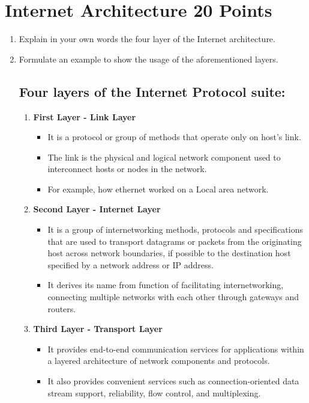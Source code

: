 \documentclass{resources/WeSTassignment}
\begin{document}
\begin{enumerate}
\end{enumerate}

	
\section{Internet Architecture \hfill{20 Points}}
\begin{enumerate}
    \item Explain in your own words the four layer of the Internet architecture.
    \item Formulate an example to show the usage of the aforementioned layers.
\subsection{Four layers of the Internet Protocol suite:}
\begin{enumerate}
    \item \textbf{First Layer - Link Layer}
	\begin{itemize}
    		\item It is a protocol or group of methods that operate only on host's link.
		\item The link is the physical and logical network component used to interconnect hosts or nodes in the network.
		\item For example, how ethernet worked on a Local area network.
	\end{itemize}
    \item \textbf{Second Layer - Internet Layer}
	\begin{itemize}
    		\item It is a group of internetworking methods, protocols and specifications that are used to transport datagrams or packets from the originating host across network boundaries, if possible to the destination host specified by a network address or IP address.
		\item It derives its name from function of facilitating internetworking, connecting multiple networks with each other through gateways and routers.
	\end{itemize}
    \item \textbf{Third Layer - Transport Layer}
	\begin{itemize}
    		\item It provides end-to-end communication services for applications within a layered architecture of network components and protocols.
		\item It also provides convenient services such as connection-oriented data stream support, reliability, flow control, and multiplexing.

\end{itemize}
\end{enumerate}
\end{enumerate}
\end{document}
